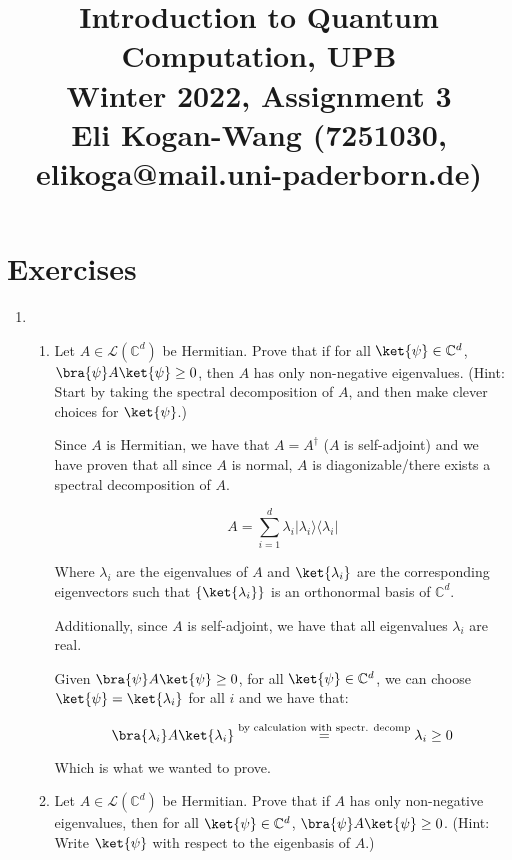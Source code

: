 \documentclass{article}
\newcommand{\ketbra}[2]{|#1\rangle\!\langle #2|}
\newcommand{\complex}{{\mathbb C}}
\newcommand{\LL}{\mathcal{L}}
\begin{document}
\title{\vspace{-10mm}Introduction to Quantum Computation, UPB\\Winter 2022, Assignment 3\\{\large Eli Kogan-Wang (7251030, elikoga@mail.uni-paderborn.de)}}
\date{}
\maketitle

\section{Exercises}
\begin{enumerate}
  \item
        \begin{enumerate}
          \item Let $A\in\LL(\complex^d)$ be Hermitian. Prove that if for all $\ket{\psi}\in\complex^d$, $\bra{\psi}A\ket{\psi}\geq 0$, then $A$ has only non-negative eigenvalues. (Hint: Start by taking the spectral decomposition of $A$, and then make clever choices for $\ket{\psi}$.)

                Since $A$ is Hermitian, we have that $A=A^\dagger$ ($A$ is self-adjoint) and we have proven that all since $A$ is normal, $A$ is diagonizable/there exists a spectral decomposition of $A$.

                $$A=\sum_{i=1}^d \lambda_i \ketbra{\lambda_i}{\lambda_i}$$

                Where $\lambda_i$ are the eigenvalues of $A$ and $\ket{\lambda_i}$ are the corresponding eigenvectors such that $\{\ket{\lambda_i}\}$ is an orthonormal basis of $\complex^d$.

                Additionally, since $A$ is self-adjoint, we have that all eigenvalues $\lambda_i$ are real.

                Given $\bra{\psi}A\ket{\psi}\geq 0$, for all $\ket{\psi}\in\complex^d$, we can choose $\ket{\psi}=\ket{\lambda_i}$ for all $i$ and we have that:

                $$\bra{\lambda_i}A\ket{\lambda_i}\overset{\text{by calculation with spectr. decomp}}{=}\lambda_i\geq0$$

                Which is what we wanted to prove.

          \item Let $A\in\LL(\complex^d)$ be Hermitian. Prove that if $A$ has only non-negative eigenvalues, then for all $\ket{\psi}\in\complex^d$, $\bra{\psi}A\ket{\psi}\geq 0$. (Hint: Write $\ket{\psi}$ with respect to the eigenbasis of $A$.)


\end{enumerate}
\end{enumerate}
\end{document}
